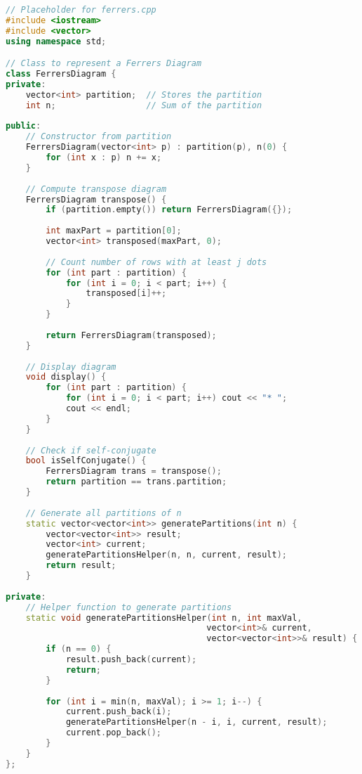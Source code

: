 \documentclass[12pt,a4paper]{article}
\theoremstyle{definition}
\begin{document}
\begin{lstlisting}[language=C++, caption=Complete C++ program]
// Placeholder for ferrers.cpp
#include <iostream>
#include <vector>
using namespace std;

// Class to represent a Ferrers Diagram
class FerrersDiagram {
private:
    vector<int> partition;  // Stores the partition
    int n;                  // Sum of the partition
    
public:
    // Constructor from partition
    FerrersDiagram(vector<int> p) : partition(p), n(0) {
        for (int x : p) n += x;
    }
    
    // Compute transpose diagram
    FerrersDiagram transpose() {
        if (partition.empty()) return FerrersDiagram({});
        
        int maxPart = partition[0];
        vector<int> transposed(maxPart, 0);
        
        // Count number of rows with at least j dots
        for (int part : partition) {
            for (int i = 0; i < part; i++) {
                transposed[i]++;
            }
        }
        
        return FerrersDiagram(transposed);
    }
    
    // Display diagram
    void display() {
        for (int part : partition) {
            for (int i = 0; i < part; i++) cout << "* ";
            cout << endl;
        }
    }
    
    // Check if self-conjugate
    bool isSelfConjugate() {
        FerrersDiagram trans = transpose();
        return partition == trans.partition;
    }
    
    // Generate all partitions of n
    static vector<vector<int>> generatePartitions(int n) {
        vector<vector<int>> result;
        vector<int> current;
        generatePartitionsHelper(n, n, current, result);
        return result;
    }
    
private:
    // Helper function to generate partitions
    static void generatePartitionsHelper(int n, int maxVal, 
                                        vector<int>& current, 
                                        vector<vector<int>>& result) {
        if (n == 0) {
            result.push_back(current);
            return;
        }
        
        for (int i = min(n, maxVal); i >= 1; i--) {
            current.push_back(i);
            generatePartitionsHelper(n - i, i, current, result);
            current.pop_back();
        }
    }
};


\end{lstlisting}
\end{document}
